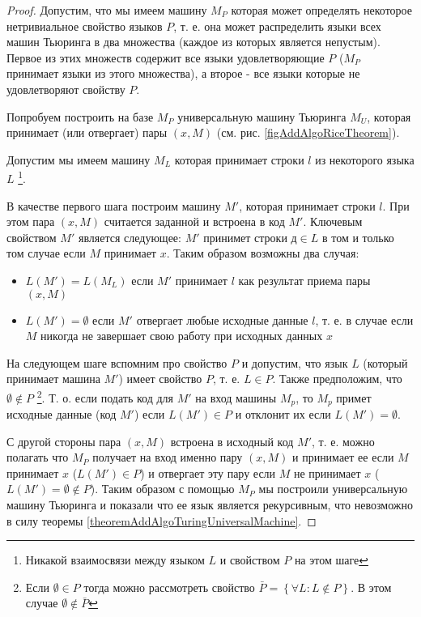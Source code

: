 \begin{proof}
Допустим, что мы имеем машину $M_P$ которая может определять
некоторое нетривиальное свойство языков $P$, т. е. она может
распределить языки всех 
машин Тьюринга в два множества (каждое из которых является непустым). 
Первое из этих множеств содержит все языки удовлетворяющие $P$ ($M_P$
принимает языки из этого множества), а второе - все языки которые не
удовлетворяют свойству $P$. 



Попробуем построить на базе $M_P$ универсальную машину Тьюринга $M_U$,
которая принимает (или отвергает) пары $\left(x, M\right)$ 
(см. рис. \ref{figAddAlgoRiceTheorem}).

Допустим мы имеем машину $M_L$ которая принимает строки $l$ из
некоторого языка $L$
\footnote{Никакой взаимосвязи между языком $L$ и свойством $P$ на этом шаге}.

В качестве первого шага построим машину $M'$, которая принимает строки
$l$. При этом пара $\left(x, M\right)$ считается заданной и встроена в
код $M'$. Ключевым свойством $M'$ является следующее: $M'$ принимет
строки $д \in L$ в том и только том случае если $M$ 
принимает $x$. Таким образом возможны два случая:
\begin{itemize}
\item $L(M') = L(M_L)$ если $M'$ принимает $l$ как результат приема
  пары $\left(x, M\right)$ 
\item $L(M') = \emptyset$ если $M'$ отвергает любые исходные данные
  $l$,
т. е. в случае если $M$ никогда не завершает свою работу при исходных
данных $x$ 
\end{itemize}

На следующем шаге вспомним про свойство $P$ и допустим, что язык $L$
(который принимает машина $M'$) имеет свойство $P$, т. е. $L \in
P$. Также предположим, что $\emptyset \notin P$
\footnote{
Если $\emptyset \in P$ тогда можно рассмотреть свойство 
$\bar{P} = \left\{\forall L: L \notin P\right\}$. В этом случае
$\emptyset \notin \bar{P}$
}. 
Т. о. если подать код
для $M'$ на вход машины $M_p$, то $M_p$ примет исходные данные (код
$M'$) если $L(M') \in P$ и отклонит их если $L(M') = \emptyset$.

С другой стороны пара $\left(x, M\right)$ встроена в исходный код
$M'$, т. е. можно полагать что $M_P$ получает на вход именно пару 
$\left(x, M\right)$ и принимает ее если $M$ принимает $x$
($L\left(M'\right) \in P$) и отвергает
эту пару если $M$ не принимает $x$ 
($L\left(M'\right) = \emptyset \notin P$). Таким образом с помощью
$M_P$ мы построили универсальную машину Тьюринга и показали что ее
язык является рекурсивным, что невозможно в силу теоремы 
\ref{theoremAddAlgoTuringUniversalMachine}.
\end{proof}

